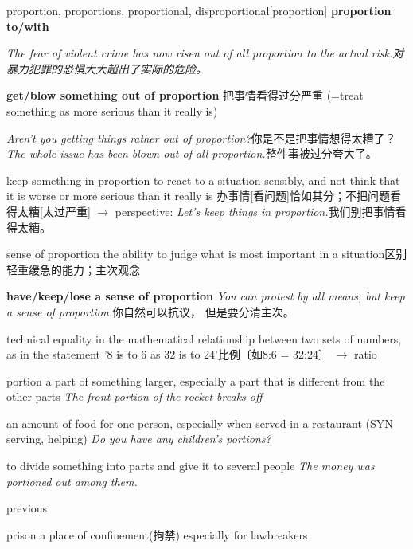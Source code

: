 \begin{DefWord}{proportion, proportions, proportional, disproportional}[proportion]
\textbf{proportion to/with}

\textit{The fear of violent crime has now risen out of all proportion to the actual risk.对暴力犯罪的恐惧大大超出了实际的危险。 }

\textbf{get/blow something out of proportion} 把事情看得过分严重
(=treat something as more serious than it really is)

\textit{Aren't you getting things rather out of proportion?}你是不是把事情想得太糟了？
\textit{The whole issue has been blown out of all proportion.}整件事被过分夸大了。 

keep something in proportion to react to a situation sensibly, and not think that it is worse or more serious than it really is 办事情[看问题]恰如其分；不把问题看得太糟[太过严重] $\rightarrow$ perspective:
\textit{Let's keep things in proportion.}我们别把事情看得太糟。 

sense of proportion the ability to judge what is most important in a situation区别轻重缓急的能力；主次观念

\textbf{have/keep/lose a sense of proportion}
\textit{You can protest by all means, but keep a sense of proportion.}你自然可以抗议， 但是要分清主次。 

technical equality in the mathematical relationship between two sets of numbers, as in the statement '8 is to 6 as 32 is to 24'比例〔如8:6 = 32:24〕 $\rightarrow$ ratio


\end{DefWord}



\begin{DefWord}{portion}
    a part of something larger, especially a part that is different from the other parts
    \textit{The front portion of the rocket breaks off}

    an amount of food for one person, especially when served in a restaurant (SYN  serving, helping)
    \textit{Do you have any children's portions?}

    to divide something into parts and give it to several people
    \textit{The money was portioned out among them.}
\end{DefWord}

\begin{DefWord}{previous}
\end{DefWord}

\begin{DefWord}{prison}
    a place of confinement(拘禁) especially for lawbreakers
\end{DefWord}

